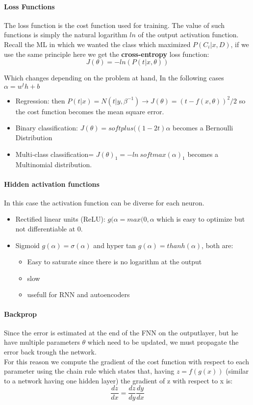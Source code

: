 \paragraph{Loss Functions}
The loss function is the cost function used for training. The value of such functions is simply the natural logarithm $ln$  of the output activation function.\\
Recall the ML in which we wanted the class which maximized $P(C_i|x,D)$, if we use the same principle here we get the \textbf{cross-entropy} loss function:
$$J(\theta)=-ln(P(t|x,\theta))$$

Which changes depending on the problem at hand,   In the following cases $\alpha=w^th+b$
\begin{itemize}
\item Regression: then $P(t|x)=N(t|y,\beta^{-1})\to J(\theta)=(t-f(x,\theta))^2/2$ so the cost function becomes the mean square error.
\item Binary classification: $J(\theta)=softplus((1-2t)\alpha$ becomes a Bernoulli Distribution
\item Multi-class classification= $J(\theta)_1=-ln\ softmax(\alpha)_1$ becomes a Multinomial distribution.
\end{itemize}

\paragraph{Hidden activation functions}
In this case the activation function can be diverse for each neuron.
\begin{itemize}
\item Rectified linear units (ReLU): $g(\alpha=max(0,\alpha$ which is easy to optimize but not differentiable at 0.
\item Sigmoid $g(\alpha)=\sigma(\alpha)$ and hyper tan $g(\alpha)=thanh(\alpha)$, both are:
	\begin{itemize}
	\item Easy to saturate since there is no logarithm at the output
	\item slow
	\item usefull for RNN and autoencoders
	\end{itemize}
\end{itemize}

\paragraph{Backprop}
Since the error is estimated at the end of the FNN on the outputlayer, but he have multiple parameters $\theta$ which need to be updated, we must propagate the error back trough the network.\\
For this reason we compute the gradient of the cost function with respect to each parameter using the chain rule which states that, having $z=f(g(x))$ (similar to a network having one hidden layer) the gradient of z with respect to x is:
$$\frac{dz}{dx}=\frac{dz}{dy}\frac{dy}{dx}$$

